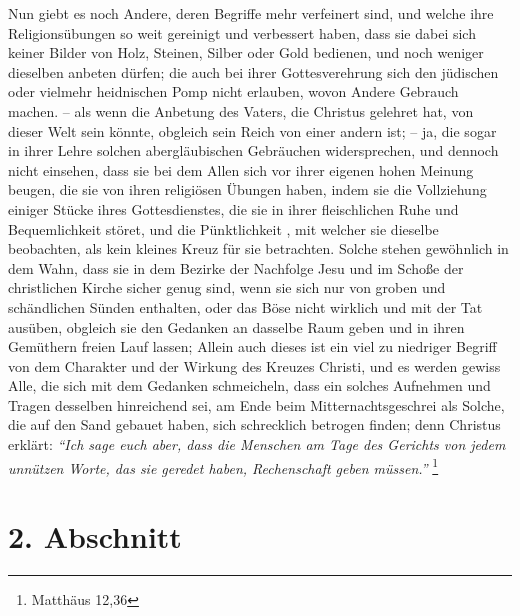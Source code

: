 Nun giebt es noch Andere, deren Begriffe mehr
verfeinert sind, und welche ihre
Religionsübungen so weit
gereinigt und verbessert haben, dass sie dabei sich keiner Bilder von Holz,
Steinen, Silber oder Gold bedienen,
und noch weniger dieselben anbeten dürfen; die auch bei ihrer Gottesverehrung
sich den jüdischen  oder vielmehr heidnischen Pomp nicht
erlauben, wovon Andere
Gebrauch
machen.  -- als wenn die Anbetung des Vaters, die Christus
gelehret hat, von
dieser Welt sein könnte, obgleich sein Reich von einer andern ist; -- ja, die
sogar in ihrer Lehre solchen abergläubischen Gebräuchen widersprechen, und
dennoch nicht einsehen, dass sie bei dem Allen sich vor ihrer eigenen hohen
Meinung beugen, die sie von ihren religiösen Übungen haben, indem sie die
Vollziehung einiger Stücke ihres Gottesdienstes, die sie in ihrer fleischlichen
Ruhe und Bequemlichkeit störet, und die Pünktlichkeit , mit
welcher sie dieselbe
beobachten, als
kein kleines Kreuz für sie betrachten. Solche stehen
gewöhnlich in dem Wahn,
dass sie in dem Bezirke der Nachfolge Jesu und im Schoße der christlichen
Kirche sicher genug sind, wenn sie sich nur von groben und schändlichen Sünden
enthalten,   oder das Böse
nicht wirklich und mit der Tat ausüben, obgleich sie
den Gedanken an dasselbe Raum geben und in ihren Gemüthern freien Lauf lassen;
Allein auch dieses ist ein viel zu niedriger Begriff von dem Charakter und der
Wirkung des Kreuzes Christi, und es werden gewiss Alle, die sich mit dem
Gedanken schmeicheln, dass ein solches Aufnehmen und Tragen desselben
hinreichend sei,  am Ende beim Mitternachtsgeschrei als
Solche, die auf den Sand
gebauet haben, sich schrecklich betrogen finden; denn Christus erklärt:
\textit{"`Ich sage euch aber, dass die Menschen am Tage des Gerichts von jedem
unnützen Worte, das sie geredet haben, Rechenschaft geben müssen."'} 
\footnote{Matthäus 12,36}

\section{2. Abschnitt} \label{kap6_ab2}

